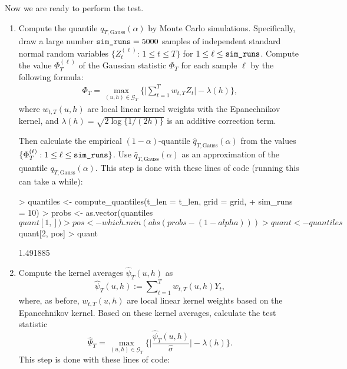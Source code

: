 \documentclass[a4paper]{article}
\begin{document}
Now we are ready to perform the test.
\begin{enumerate}[label=\textit{Step \arabic*.}, leftmargin=1.45cm]
  \item Compute the quantile $q_{T,\text{Gauss}}(\alpha)$ by Monte Carlo simulations. Specifically, draw a large number $\verb|sim_runs| = 5000$ samples of independent standard normal random variables $\{Z_{t}^{(\ell)} : \, 1 \le t \le T \}$ for $1 \le \ell \le \verb|sim_runs|$. Compute the value $\Phi_T^{(\ell)}$ of the Gaussian statistic $\Phi_T$ for each sample $\ell$ by the following formula:
\begin{align*}
\Phi_T = \max_{(u, h) \in \mathcal{G}_T}\bigg\{ \Big|\sum\limits_{t=1}^T w_{t, T} Z_{t}\Big| - \lambda(h) \bigg\},
\end{align*}
where $w_{t, T}(u, h)$ are local linear kernel weights with the Epanechnikov kernel, and $\lambda(h) = \sqrt{2 \log \{ 1/(2h) \}}$ is an additive correction term.

Then calculate the empirical $(1-\alpha)$-quantile $\widehat{q}_{T,\text{Gauss}}(\alpha)$ from the values $\{ \Phi_T^{(\ell)}: 1 \le \ell \le \verb|sim_runs| \}$. Use $\widehat{q}_{T,\text{Gauss}}(\alpha)$ as an approximation of the quantile $q_{T,\text{Gauss}}(\alpha)$.
This step is done with these lines of code (running this can take a while):

\begin{Schunk}
\begin{Sinput}
> quantiles <- compute_quantiles(t_len = t_len, grid = grid,
+                                sim_runs = 10)
> probs <- as.vector(quantiles$quant[1, ])
> pos   <- which.min(abs(probs - (1 - alpha)))
> quant <- quantiles$quant[2, pos]
> quant
\end{Sinput}
\begin{Soutput}
[1] 1.491885
\end{Soutput}
\end{Schunk}
  \item Compute the kernel averages $\widehat{\psi}_{T}(u, h)$ as
  \begin{equation*}
 \widehat{\psi}_{T}(u, h) := \sum\nolimits_{t=1}^T w_{t, T}(u, h) Y_{t},
\end{equation*}
where, as before, $w_{t, T}(u, h)$ are local linear kernel weights based on the Epanechnikov kernel. Based on these kernel averages, calculate the test statistic
$$\widehat{\Psi}_{T} = \max_{(u, h)\in \mathcal{G}_T} \bigg\{ \Big| \frac{\widehat{\psi}_{T}(u, h) }{\widehat{\sigma}}\Big| - \lambda(h) \Bigg\}.$$
This step is done with these lines of code:


\end{enumerate}
\end{document}

